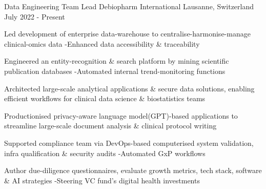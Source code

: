 

\begin{cventries}

\vspace{-0.3cm}
 \cventry
    {Data Engineering Team Lead} %
    {Debiopharm International} %
    {Lausanne, Switzerland} %
    {July 2022 - Present} %
    {
      \begin{cvitems} %
        \item {Led development of enterprise data-warehouse to centralise-harmonise-manage clinical-omics data -Enhanced data accessibility \& traceability}
        \item {Engineered an entity-recognition \& search platform by mining scientific publication databases -Automated internal trend-monitoring functions}
        \item {Architected large-scale analytical applications \& secure data solutions, enabling efficient workflows for clinical data science \& biostatistics teams}
        \item {Productionised privacy-aware language model(GPT)-based applications to streamline large-scale document analysis \& clinical protocol writing}
        \item {Supported compliance team via DevOps-based computerised system validation, infra qualification \& security audits -Automated GxP workflows}
        \item {Author due-diligence questionnaires, evaluate growth metrics, tech stack, software \& AI strategies -Steering VC fund's digital health investments}
      \end{cvitems}
    }


\end{cventries}
